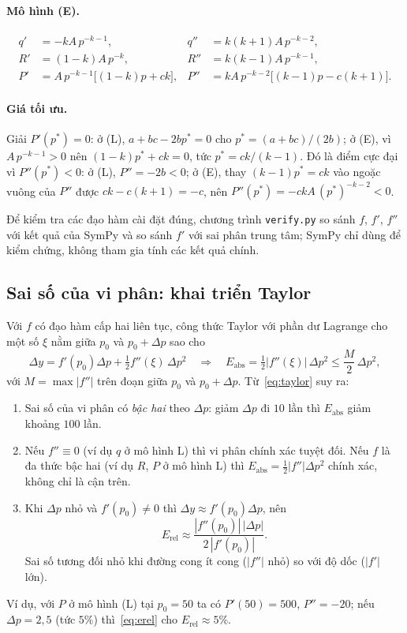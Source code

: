 \paragraph{Mô hình (E).}
\begin{align*}
q' &= -kA\,p^{-k-1}, & q'' &= k(k+1)A\,p^{-k-2}, \\
R' &= (1-k)A\,p^{-k}, & R'' &= k(k-1)A\,p^{-k-1}, \\
P' &= A\,p^{-k-1}\bigl[(1-k)p+ck\bigr], &
P'' &= kA\,p^{-k-2}\bigl[(k-1)p-c(k+1)\bigr].
\end{align*}

\paragraph{Giá tối ưu.}
Giải $P'(p^*)=0$: ở (L), $a+bc-2bp^*=0$ cho $p^*=(a+bc)/(2b)$; ở (E), vì
$A\,p^{-k-1}>0$ nên $(1-k)p^*+ck=0$, tức $p^*=ck/(k-1)$. Đó là điểm cực đại vì
$P''(p^*)<0$: ở (L), $P''=-2b<0$; ở (E), thay $(k-1)p^*=ck$ vào ngoặc vuông của $P''$
được $ck-c(k+1)=-c$, nên $P''(p^*)=-ckA\,(p^*)^{-k-2}<0$.

Để kiểm tra các đạo hàm cài đặt đúng, chương trình \texttt{verify.py} so sánh $f$,
$f'$, $f''$ với kết quả của SymPy và so sánh $f'$ với sai phân trung tâm; SymPy chỉ
dùng để kiểm chứng, không tham gia tính các kết quả chính.

\subsection{Sai số của vi phân: khai triển Taylor}
Với $f$ có đạo hàm cấp hai liên tục, công thức Taylor với phần dư Lagrange cho một số
$\xi$ nằm giữa $p_0$ và $p_0+\Delta p$ sao cho
\begin{equation}\label{eq:taylor}
\Delta y = f'(p_0)\Delta p + \tfrac12 f''(\xi)\,\Delta p^2
\quad\Longrightarrow\quad
E_{\mathrm{abs}} = \tfrac12 |f''(\xi)|\,\Delta p^2 \le \frac{M}{2}\,\Delta p^2,
\end{equation}
với $M=\max|f''|$ trên đoạn giữa $p_0$ và $p_0+\Delta p$. Từ~\eqref{eq:taylor} suy ra:
\begin{enumerate}
  \item Sai số của vi phân có \emph{bậc hai} theo $\Delta p$: giảm $\Delta p$ đi $10$
        lần thì $E_{\mathrm{abs}}$ giảm khoảng $100$ lần.
  \item Nếu $f''\equiv 0$ (ví dụ $q$ ở mô hình L) thì vi phân chính xác tuyệt đối. Nếu
        $f$ là đa thức bậc hai (ví dụ $R$, $P$ ở mô hình L) thì
        $E_{\mathrm{abs}}=\tfrac12|f''|\Delta p^2$ chính xác, không chỉ là cận trên.
  \item Khi $\Delta p$ nhỏ và $f'(p_0)\neq 0$ thì $\Delta y\approx f'(p_0)\Delta p$, nên
        \begin{equation}\label{eq:erel}
        E_{\mathrm{rel}}\approx \frac{|f''(p_0)|\,|\Delta p|}{2\,|f'(p_0)|}.
        \end{equation}
        Sai số tương đối nhỏ khi đường cong ít cong ($|f''|$ nhỏ) so với độ dốc ($|f'|$ lớn).
\end{enumerate}
Ví dụ, với $P$ ở mô hình (L) tại $p_0=50$ ta có $P'(50)=500$, $P''=-20$; nếu
$\Delta p=2{,}5$ (tức $5\%$) thì~\eqref{eq:erel} cho $E_{\mathrm{rel}}\approx 5\%$.

